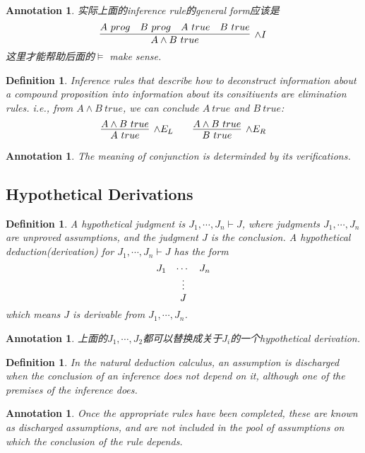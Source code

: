\documentclass{article}
\theoremstyle{plain}
\newtheorem{definition}[theorem]{Definition}
\newtheorem{annotation}[theorem]{Annotation}
\theoremstyle{nonumberplain}
\begin{document}
\begin{annotation}
\rm 实际上面的inference rule的general form应该是
$$
\infer[\wedge I]{A \wedge B ~true}{A~prog & B~prog & A~true & B~true}
$$
这里才能帮助后面的$\vDash$ make sense. 
\end{annotation}

\begin{definition}
\rm Inference rules that describe how to deconstruct information about a compound proposition into information about its consitiuents are elimination rules. i.e., from $A \wedge B~true$, we can conclude $A~true$ and $B~true$:
$$
\infer[\wedge E_L]{A~true}{A \wedge B ~true}~~~~~~\infer[\wedge E_R]{B~true}{A \wedge B ~true} 
$$
\end{definition}

\begin{annotation}
\rm The meaning of conjunction is determinded by its \emph{verifications}.  
\end{annotation}

\subsection{Hypothetical Derivations}

\begin{definition}
\rm A \emph{hypothetical judgment} is $J_1, \cdots, J_n \vdash J$, where judgments $J_1,\cdots,J_n$ are unproved assumptions, and the judgment $J$ is the conclusion. A \emph{hypothetical deduction}(derivation) for $J_1, \cdots, J_n \vdash J$ has the form 
$$
\deduce[\vdots]{\raisebox{-1.0em}{$J$}}{J_1 & \cdots & J_n}
$$
which means $J$ is derivable from $J_1, \cdots, J_n$. 
\end{definition}

\begin{annotation}
\rm 上面的$J_1,\cdots,J_2$都可以替换成关于$J_i$的一个hypothetical derivation. 
\end{annotation}


\begin{definition}
\rm In the natural deduction calculus, an assumption is discharged when the conclusion of an inference does not depend on it, although one of the premises of the inference does\cite{tln}.
\end{definition}

\begin{annotation}
\rm Once the appropriate rules have been completed, these are known as discharged assumptions, and are not included in the pool of assumptions on which the conclusion of the rule depends\cite{discharged-proofwiki}.
\end{annotation}
\end{document}
